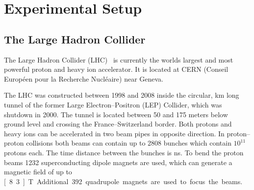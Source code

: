 \chapter{Experimental Setup}\label{cha:setup}

\section{The Large Hadron Collider}\label{sec:setup:lhc}

The Large Hadron Collider (LHC)~\cite{LHC} is currently the worlds largest and most powerful proton and heavy ion accelerator.
It is located at CERN (Conseil Européen pour la Recherche Nucléaire) near Geneva.

The LHC was constructed between 1998 and 2008 inside the circular, \unit[27]{km} long tunnel
of the former Large Electron--Positron (LEP) Collider, which was shutdown in 2000.
The tunnel is located between 50 and 175 meters below ground level and crossing the France--Switzerland border.
Both protons and heavy ions can be accelerated in two beam pipes in opposite direction.
In proton--proton collisions both beams can contain up to 2808 bunches which contain $10^{11}$ protons each.
The time distance between the bunches is \unit[25]{ns}.
To bend the proton beams 1232 superconducting dipole magnets are used, which can generate a magnetic field of up
to \unit[8.3]{T}.
Additional 392 quadrupole magnets are used to focus the beams.

